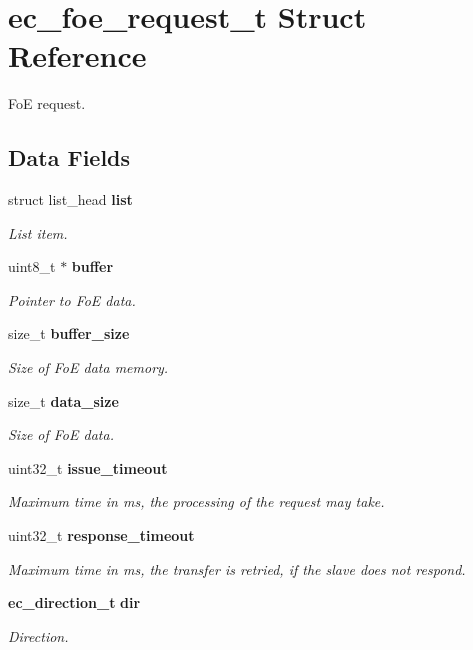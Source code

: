 \section{ec\-\_\-foe\-\_\-request\-\_\-t Struct Reference}
\label{structec__foe__request__t}


Fo\-E request.  


\subsection*{Data Fields}
\begin{DoxyCompactItemize}
\item 
struct list\-\_\-head {\bf list}
\begin{DoxyCompactList}\small\item\em List item. \end{DoxyCompactList}\item 
uint8\-\_\-t $\ast$ {\bf buffer}
\begin{DoxyCompactList}\small\item\em Pointer to Fo\-E data. \end{DoxyCompactList}\item 
size\-\_\-t {\bf buffer\-\_\-size}
\begin{DoxyCompactList}\small\item\em Size of Fo\-E data memory. \end{DoxyCompactList}\item 
size\-\_\-t {\bf data\-\_\-size}
\begin{DoxyCompactList}\small\item\em Size of Fo\-E data. \end{DoxyCompactList}\item 
uint32\-\_\-t {\bf issue\-\_\-timeout}
\begin{DoxyCompactList}\small\item\em Maximum time in ms, the processing of the request may take. \end{DoxyCompactList}\item 
uint32\-\_\-t {\bf response\-\_\-timeout}
\begin{DoxyCompactList}\small\item\em Maximum time in ms, the transfer is retried, if the slave does not respond. \end{DoxyCompactList}\item 
{\bf ec\-\_\-direction\-\_\-t} {\bf dir}
\begin{DoxyCompactList}\small\item\em Direction. \end{DoxyCompactList}\item 

\end{DoxyCompactItemize}
